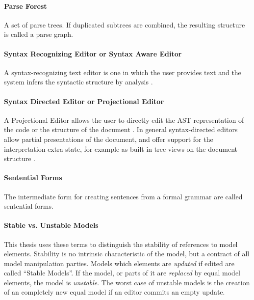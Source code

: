 \paragraph{Parse Forest} 
A set of parse trees. If duplicated subtrees are combined, the resulting structure is called a parse graph. \cite{ParserBook}

\paragraph{Syntax Recognizing Editor or Syntax Aware Editor} A syntax-recognizing text editor is one in which the user provides text and the system infers the syntactic structure by analysis \cite{pan}. 

\paragraph{Syntax Directed Editor or Projectional Editor} A Projectional Editor allows the user to directly edit the AST representation of the code or the structure of the document \cite{MPS}. In general syntax-directed editors allow partial presentations of the document, and offer support for the interpretation extra state, for example as built-in tree views on the document structure \cite{proxima}.

\paragraph{Sentential Forms}   
The intermediate form for creating sentences from a formal grammar are called sentential forms. \cite{ParserBook}

\paragraph{Stable vs. Unstable Models}
This thesis uses these terms to distinguish the stability of references to model elements. Stability is no intrinsic characteristic of the model, but a contract of all model manipulation parties. Models which elements are \emph{updated} if edited are called ``Stable Models''. If the model, or parts of it are \emph{replaced} by equal model elements, the model is \emph{unstable}. The worst case of unstable models is the creation of an completely new equal model if an editor commits an empty update.

